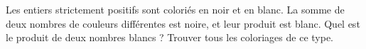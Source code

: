 Les entiers strictement positifs sont coloriés en noir et en blanc. La somme de deux nombres de couleurs différentes est noire, et leur produit est blanc. Quel est le produit de deux nombres blancs ? Trouver tous les coloriages de ce type.
